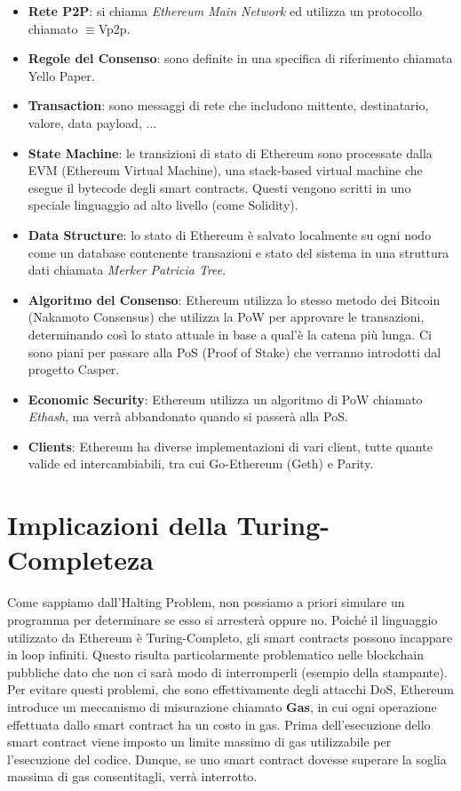 \begin{itemize}
      \item \textbf{Rete P2P}: si chiama \textit{Ethereum Main Network} ed
            utilizza un protocollo chiamato \DH$\equiv$Vp2p.
      \item \textbf{Regole del Consenso}: sono definite in una specifica di riferimento chiamata
            Yello Paper.
      \item \textbf{Transaction}: sono messaggi di rete che includono mittente, destinatario,
            valore, data payload, ...
      \item \textbf{State Machine}: le transizioni di stato di Ethereum sono processate dalla
            EVM (Ethereum Virtual Machine), una stack-based virtual machine che esegue il bytecode
            degli smart contracts. Questi vengono scritti in uno speciale linguaggio ad alto livello
            (come Solidity).
      \item \textbf{Data Structure}: lo stato di Ethereum è salvato localmente su ogni nodo come
            un database contenente transazioni e stato del sistema in una struttura dati chiamata
            \textit{Merker Patricia Tree}.
      \item \textbf{Algoritmo del Consenso}: Ethereum utilizza lo stesso metodo dei Bitcoin
            (Nakamoto Consensus) che utilizza la PoW per approvare le transazioni,
            determinando così lo stato attuale in base a qual'è la catena più lunga.
            Ci sono piani per passare alla PoS (Proof of Stake) che verranno introdotti dal
            progetto Casper.
      \item \textbf{Economic Security}: Ethereum utilizza un algoritmo di PoW chiamato \textit{Ethash},
            ma verrà abbandonato quando si passerà alla PoS.
      \item \textbf{Clients}: Ethereum ha diverse implementazioni di vari client,
            tutte quante valide ed intercambiabili, tra cui Go-Ethereum (Geth) e Parity.
\end{itemize}

\section{Implicazioni della Turing-Completeza}
Come sappiamo dall'Halting Problem, non possiamo a priori simulare un programma per
determinare se esso si arresterà oppure no. Poiché il linguaggio utilizzato da Ethereum è
Turing-Completo, gli smart contracts possono incappare in loop infiniti. Questo risulta
particolarmente problematico nelle blockchain pubbliche dato che non ci sarà modo di interromperli
(esempio della stampante). Per evitare questi problemi, che sono effettivamente degli attacchi DoS,
Ethereum introduce un meccanismo di misurazione chiamato \textbf{Gas}, in cui ogni operazione
effettuata dallo smart contract ha un costo in gas. Prima dell'esecuzione dello smart contract
viene imposto un limite massimo di gas utilizzabile per l'esecuzione del codice.
Dunque, se uno smart contract dovesse superare la soglia massima di gas consentitagli,
verrà interrotto.\\

